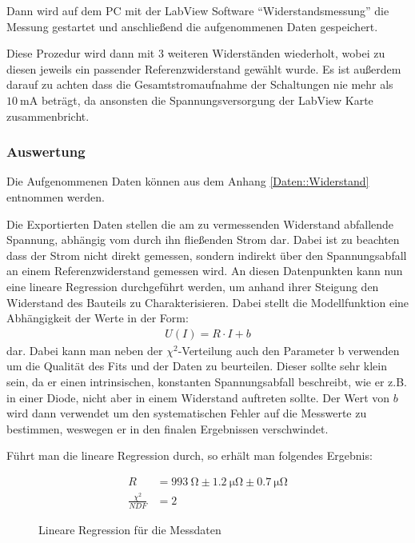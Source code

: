 \documentclass[12pt,twoside,a4paper]{scrartcl}
\begin{document}
				Dann wird auf dem PC mit der LabView Software ``Widerstandsmessung'' die Messung gestartet und anschließend die aufgenommenen Daten gespeichert.

				Diese Prozedur wird dann mit 3 weiteren Widerständen wiederholt, wobei zu diesen jeweils ein passender Referenzwiderstand gewählt wurde.
				Es ist außerdem darauf zu achten dass die Gesamtstromaufnahme der Schaltungen nie mehr als $\SI{10}{\milli \ampere}$ beträgt, da ansonsten die Spannungsversorgung der LabView Karte zusammenbricht.

			\subsubsection{Auswertung}

				Die Aufgenommenen Daten können aus dem Anhang \ref{Daten::Widerstand} entnommen werden.

				Die Exportierten Daten stellen die am zu vermessenden Widerstand abfallende Spannung, abhängig vom durch ihn fließenden Strom dar. Dabei ist zu beachten dass der Strom nicht direkt gemessen, sondern indirekt über den Spannungsabfall an einem Referenzwiderstand gemessen wird. An diesen Datenpunkten kann nun eine lineare Regression durchgeführt werden, um anhand ihrer Steigung den Widerstand des Bauteils zu Charakterisieren. Dabei stellt die Modellfunktion eine Abhängigkeit der Werte in der Form:
				\begin{align*}
					U(I) = R \cdot I + b
				\end{align*}
				dar. Dabei kann man neben der $\chi^2$-Verteilung auch den Parameter b verwenden um die Qualität des Fits und der Daten zu beurteilen. Dieser sollte sehr klein sein, da er einen intrinsischen, konstanten Spannungsabfall beschreibt, wie er z.B. in einer Diode, nicht aber in einem Widerstand auftreten sollte.
				Der Wert von $b$ wird dann verwendet um den systematischen Fehler auf die Messwerte zu bestimmen, weswegen er in den finalen Ergebnissen verschwindet.

				Führt man die lineare Regression durch, so erhält man folgendes Ergebnis:

				\begin{figure}[H]
					\centering
					\begin{minipage}{0.69 \textwidth}
						\caption{Lineare Regression für die Messdaten}
					\end{minipage}
					\begin{minipage}{0.29 \textwidth}
						\begin{align*}
							R &= \SI{993}{\ohm} \pm \SI{1.2}{\micro \ohm} \pm \SI{0.7}{\micro \ohm}\\
							\frac{\chi^2}{NDF} &= 2
						\end{align*}
					\end{minipage}
			\end{figure}
\end{document}
